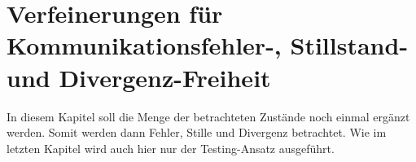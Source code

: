 \chapter{Verfeinerungen für Kommunikationsfehler-, Stillstand- und
Divergenz-Freiheit}

In diesem Kapitel soll die Menge der betrachteten Zustände noch einmal
ergänzt werden. Somit werden dann Fehler, Stille und Divergenz betrachtet. Wie
im letzten Kapitel wird auch hier nur der Testing-Ansatz ausgeführt.



% 


